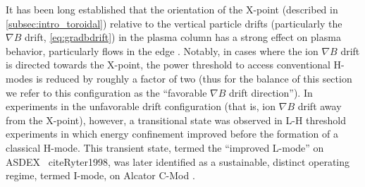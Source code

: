 It has been long established that the orientation of the X-point (described in \cref{subsec:intro_toroidal}) relative to the vertical particle drifts (particularly the $\nabla B$ drift, \cref{eq:gradbdrift}) in the plasma column has a strong effect on plasma behavior, particularly flows in the edge \cite{LaBombard2004,Fenzi2005,Hubbard2007,LaBombard2008}.  Notably, in cases where the ion $\nabla B$ drift is directed towards the X-point, the power threshold to access conventional H-modes is reduced by roughly a factor of two \cite{Carlstrom1998,Groebner1998,Suttrop2003} (thus for the balance of this section we refer to this configuration as the ``favorable $\nabla B$ drift direction'').  In experiments in the unfavorable drift configuration (that is, ion $\nabla B$ drift away from the X-point), however, a transitional state was observed in L-H threshold experiments in which energy confinement improved before the formation of a classical H-mode.  This transient state, termed the ``improved L-mode'' on ASDEX \
cite{Ryter1998}, was later identified as a sustainable, distinct operating regime, termed I-mode, on Alcator C-Mod \cite{Whyte2010,McDermott2009a,Hubbard2011}.

\begin{figure}[t]
 \pushtooutside
\end{figure}

